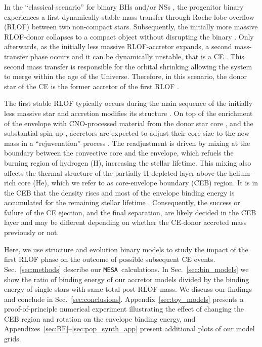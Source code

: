 \documentclass[twocolumn,twocolappendix,trackchanges]{aastex63}
\newcommand{\code}[1]{\texttt{#1}}
\newcommand{\mesa}{\code{MESA}}
\DeclareRobustCommand{\Secref}[1]{Sec.~\ref{#1}}
\begin{document}
In the ``classical scenario'' for binary BHs and/or NSs
\citep[e.g.,][]{tutukov:93,belczynski:2016, tauris:2017}, the
progenitor binary experiences a first dynamically stable mass transfer
through Roche-lobe overflow (RLOF) between two non-compact stars.
Subsequently, the initially more massive RLOF-donor collapses to a
compact object without disrupting the binary
\citep[e.g.,][]{blaauw:1961,renzo:2019walk}. Only afterwards, as the
initially less massive RLOF-accretor expands, a second mass-transfer
phase occurs and it can be dynamically unstable, that is a CE
\citep[e.g.,][]{dominik:2012, belczynski:2016, kruckow:18}. This
second mass transfer is responsible for the orbital shrinking
\citep{paczynski:1976} allowing the system to merge within the age of
the Universe. Therefore, in this scenario, the donor star of the CE is
the former accretor of the first RLOF \citep[e.g.,][]{klencki:2020,
  law-smith:2020, renzo:2021zoph}.

The first stable RLOF typically occurs during the main sequence of the
initially less massive star and accretion modifies its structure
\citep[e.g.,][]{neo:1977, packet:1981, blaauw:1993, cantiello:2007,
  renzo:2021zoph}. On top of the enrichment of the envelope with
CNO-processed material from the donor star core \citep{blaauw:1993,
  renzo:2021zoph, el-badry:2022a}, and the substantial spin-up \citep[e.g.,][]{packet:1981},
accretors are expected to adjust their core-size to the new mass in a
``rejuvenation'' process \citep[e.g.,][]{neo:1977, hellings:1983,
  hellings:1984}. The readjustment is driven by mixing at the boundary
between the convective core and the envelope, which refuels the
burning region of hydrogen (H), increasing the stellar lifetime. This
mixing also affects the thermal structure of the partially H-depleted
layer above the helium-rich core (He), which we refer to as
core-envelope boundary (CEB) region. It is in the CEB that the density
rises and most of the envelope binding energy is accumulated for the
remaining stellar lifetime \citep[e.g.,][]{tauris:01, ivanova:2013,
  ivanova:2020}. Consequently, the success or failure of the CE
ejection, and the final separation, are likely decided in the CEB
layer and may be different depending on whether the CE-donor accreted
mass previously or not.

Here, we use structure and evolution binary models to study the impact
of the first RLOF phase on the outcome of possible subsequent CE
events. \Secref{sec:methods} describe our \mesa\ calculations. In
\Secref{sec:bin_models} we show the ratio of binding energy of our
accretor models divided by the binding energy of single stars with same
total post-RLOF mass. We discuss our findings and conclude in
\Secref{sec:conclusions}. Appendix~\ref{sec:toy_models} presents a
proof-of-principle numerical experiment illustrating the effect of
changing the CEB region and rotation on the envelope binding energy,
and Appendixes~\ref{sec:BE}--\ref{sec:pop_synth_app} present
additional plots of our model grids.
\end{document}
